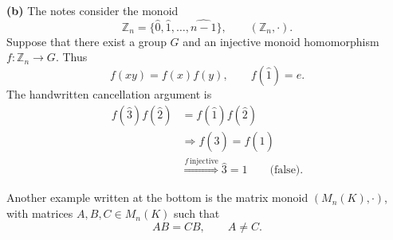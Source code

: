 \medskip
\noindent\textbf{(b)} The notes consider the monoid
\[
  \mathbb Z_n=\{\widehat{0},\widehat{1},\ldots,
      \widehat{n-1}\},\qquad (\mathbb Z_n,\cdot).
\]
Suppose that there exist a group $G$ and an injective monoid
homomorphism $f:\mathbb Z_n\to G$. Thus
\[
  f(xy)=f(x)f(y),\qquad f(\widehat{1})=e.
\]
The handwritten cancellation argument is
\[
\begin{aligned}
  f(\widehat{3})f(\widehat{2})
    &=f(\widehat{1})f(\widehat{2})\\
  &\Longrightarrow f(\widehat{3})=f(\widehat{1})\\
  &\overset{f\,\mathrm{injective}}{\Longrightarrow}
      \widehat{3}=\widehat{1}\qquad\text{(false).}
\end{aligned}
\]

\noindent Another example written at the bottom is the matrix monoid
$(M_n(K),\cdot)$, with matrices $A,B,C\in M_n(K)$ such that
\[
  AB=CB,\qquad A\neq C.
\]
